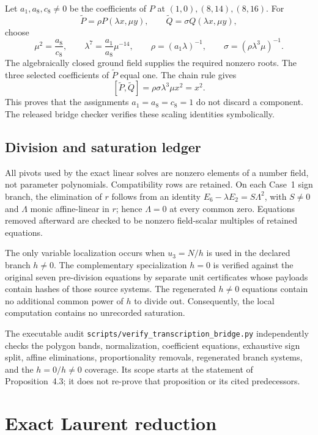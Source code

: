 \documentclass[11pt,a4paper]{article}
\theoremstyle{remark}
\begin{document}
Let $a_1,a_8,c_8\ne0$ be the coefficients of $P$ at $(1,0),(8,14),(8,16)$. For
\[
\widetilde P=\rho P(\lambda x,\mu y),\qquad
\widetilde Q=\sigma Q(\lambda x,\mu y),
\]
choose
\[
\mu^2=\frac{a_8}{c_8},\qquad
\lambda^7=\frac{a_1}{a_8}\mu^{-14},\qquad
\rho=(a_1\lambda)^{-1},\qquad
\sigma=(\rho\lambda^3\mu)^{-1}.
\]
The algebraically closed ground field supplies the required nonzero roots. The three selected coefficients of $\widetilde P$ equal one. The chain rule gives
\[
[\widetilde P,\widetilde Q]=\rho\sigma\lambda^3\mu x^2=x^2.
\]
This proves that the assignments $a_1=a_8=c_8=1$ do not discard a component. The released bridge checker verifies these scaling identities symbolically.

\subsection{Division and saturation ledger}

All pivots used by the exact linear solves are nonzero elements of a number field, not parameter polynomials. Compatibility rows are retained. On each Case~1 sign branch, the elimination of $r$ follows from an identity $E_6-\lambda E_2=S\Lambda^2$, with $S\ne0$ and $\Lambda$ monic affine-linear in $r$; hence $\Lambda=0$ at every common zero. Equations removed afterward are checked to be nonzero field-scalar multiples of retained equations.

The only variable localization occurs when $u_3=N/h$ is used in the declared branch $h\ne0$. The complementary specialization $h=0$ is verified against the original seven pre-division equations by separate unit certificates whose payloads contain hashes of those source systems. The regenerated $h\ne0$ equations contain no additional common power of $h$ to divide out. Consequently, the local computation contains no unrecorded saturation.

The executable audit \texttt{scripts/verify\_transcription\_bridge.py} independently checks the polygon bands, normalization, coefficient equations, exhaustive sign split, affine eliminations, proportionality removals, regenerated branch systems, and the $h=0/h\ne0$ coverage. Its scope starts at the statement of Proposition~4.3; it does not re-prove that proposition or its cited predecessors.

\section{Exact Laurent reduction}
\end{document}
